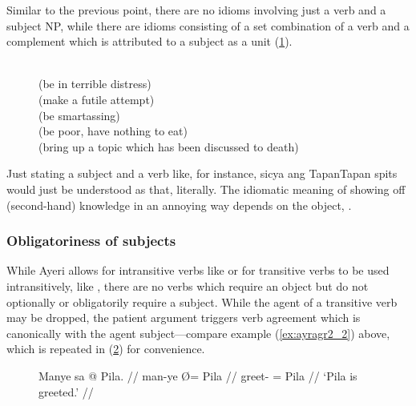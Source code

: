 Similar to the previous point, there are no idioms involving just a verb and a
subject NP, while there are idioms consisting of a set combination of a verb
and a complement which is attributed to a subject as a unit (\ref{ex:ayridms}).

\begin{figure}[h]
\pex\label{ex:ayridms}
\a {} \\
	(be in terrible distress)
\a {} \\
	(make a futile attempt)
\a {} \\
	(be smartassing)
\a {} \\
	(be poor, have nothing to eat)
\a {} \\
	(bring up a topic which has been discussed to death)
\xe
\end{figure}

Just stating a subject and a verb like, for instance, 
{sicya ang Tapan}{Tapan spits} would just be understood as that, literally. The
idiomatic meaning of showing off (second-hand) knowledge in an annoying way
depends on the object, .

\subsubsection{Obligatoriness of subjects}

While Ayeri allows for intransitive verbs like  or for
transitive verbs to be used intransitively, like ,
there are no verbs which require an object but do not optionally or
obligatorily require a subject. While the agent of a transitive verb may be
dropped, the patient argument triggers verb agreement which is canonically with
the agent subject---compare example (\ref{ex:ayragr2_2}) above, which is
repeated in (\ref{ex:passnosubj}) for convenience.

\begin{figure}[h]
\ex\label{ex:passnosubj}\begingl
	\gla Manye sa @ Pila. //
	\glb man-ye Ø= Pila //
	\glc greet-\TsgF{} \Parg{}= Pila //
	\glft `Pila is greeted.' //
\endgl\xe
\end{figure}

